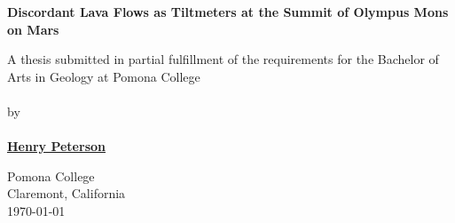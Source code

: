 \begin{titlepage}
    \begin{center}

        \phantom{.}

        \vfill
 
        \large\textbf{Discordant Lava Flows as Tiltmeters at the Summit of Olympus Mons on Mars}

        \vfill
        \vfill
        \vfill

        A thesis submitted in partial fulfillment of the requirements for the Bachelor of Arts in Geology at Pomona College
        \\~\\
        by
        \\~\\
        \textbf{\href{mailto:hgpa2018@mymail.pomona.edu}{Henry Peterson}}
             
        \vfill
        \vfill
        \vfill

        Pomona College\\
        Claremont, California\\
        \today

    \end{center}
 \end{titlepage}